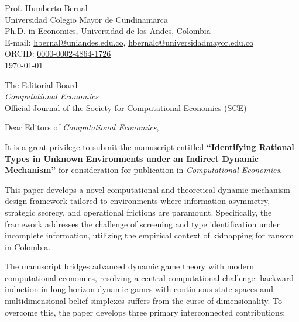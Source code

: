 \documentclass[12pt]{article}
\begin{document}
\singlespacing

\begin{flushright}
Prof. Humberto Bernal \\
Universidad Colegio Mayor de Cundinamarca \\
Ph.D. in Economics, Universidad de los Andes, Colombia \\
E-mail: \href{mailto:hbernal@uniandes.edu.co}{hbernal@uniandes.edu.co}, \href{mailto:hbernalc@universidadmayor.edu.co}{hbernalc@universidadmayor.edu.co} \\
ORCID: \href{https://orcid.org/0000-0002-4864-1726}{0000-0002-4864-1726} \\
\today
\end{flushright}

\vspace{1.5em}

\begin{flushleft}
The Editorial Board \\
\textit{Computational Economics} \\
Official Journal of the Society for Computational Economics (SCE)
\end{flushleft}

\vspace{1.5em}

\noindent Dear Editors of \textit{Computational Economics},

\vspace{1.5em}

\noindent It is a great privilege to submit the manuscript entitled \textbf{``Identifying Rational Types in Unknown Environments under an Indirect Dynamic Mechanism''} for consideration for publication in \textit{Computational Economics}.

This paper develops a novel computational and theoretical dynamic mechanism design framework tailored to environments where information asymmetry, strategic secrecy, and operational frictions are paramount. Specifically, the framework addresses the challenge of screening and type identification under incomplete information, utilizing the empirical context of kidnapping for ransom in Colombia.

The manuscript bridges advanced dynamic game theory with modern computational economics, resolving a central computational challenge: backward induction in long-horizon dynamic games with continuous state spaces and multidimensional belief simplexes suffers from the curse of dimensionality. To overcome this, the paper develops three primary interconnected contributions:
\end{document}
